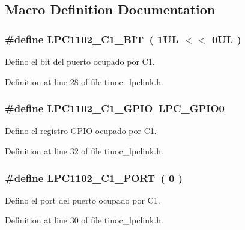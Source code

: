 \subsection{Macro Definition Documentation}
\subsubsection[{\texorpdfstring{L\+P\+C1102\+\_\+\+C1\+\_\+\+B\+IT}{LPC1102_C1_BIT}}]{\setlength{\rightskip}{0pt plus 5cm}\#define L\+P\+C1102\+\_\+\+C1\+\_\+\+B\+IT~( 1\+U\+L $<$$<$ 0\+U\+L )}\hypertarget{group___p_i_n_c1_gac6a22e60c760c46ea90fb0ebe728baa1}{}\label{group___p_i_n_c1_gac6a22e60c760c46ea90fb0ebe728baa1}


Defino el bit del puerto ocupado por C1. 



Definition at line 28 of file tinoc\+\_\+lpclink.\+h.

\subsubsection[{\texorpdfstring{L\+P\+C1102\+\_\+\+C1\+\_\+\+G\+P\+IO}{LPC1102_C1_GPIO}}]{\setlength{\rightskip}{0pt plus 5cm}\#define L\+P\+C1102\+\_\+\+C1\+\_\+\+G\+P\+IO~L\+P\+C\+\_\+\+G\+P\+I\+O0}\hypertarget{group___p_i_n_c1_gae77ae547e9f51dd166db043d9c2ab9ea}{}\label{group___p_i_n_c1_gae77ae547e9f51dd166db043d9c2ab9ea}


Defino el registro G\+P\+IO ocupado por C1. 



Definition at line 32 of file tinoc\+\_\+lpclink.\+h.

\subsubsection[{\texorpdfstring{L\+P\+C1102\+\_\+\+C1\+\_\+\+P\+O\+RT}{LPC1102_C1_PORT}}]{\setlength{\rightskip}{0pt plus 5cm}\#define L\+P\+C1102\+\_\+\+C1\+\_\+\+P\+O\+RT~( 0 )}\hypertarget{group___p_i_n_c1_ga858dd06436643c005fd1f54e54091e82}{}\label{group___p_i_n_c1_ga858dd06436643c005fd1f54e54091e82}


Defino el port del puerto ocupado por C1. 



Definition at line 30 of file tinoc\+\_\+lpclink.\+h.

